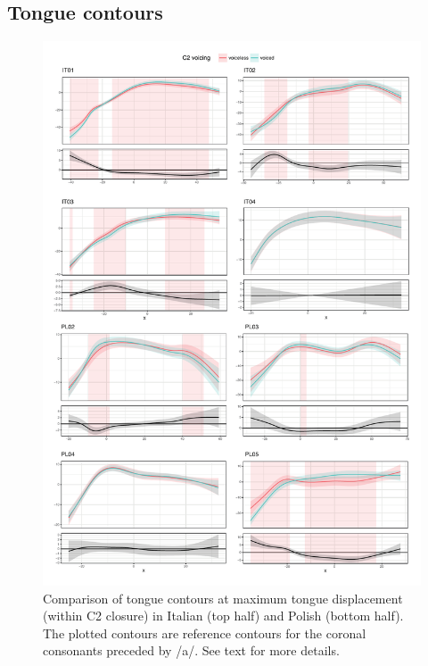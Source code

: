 \documentclass[authoryear, twocolumn]{elsarticle}
\begin{document}
\subsection{Tongue contours}\label{tongue-contours}

\begin{figure}
    \centering
    \includegraphics[height=.9\textheight]{fig/tra.pdf}
    \caption{Comparison of tongue contours at maximum tongue displacement (within C2 closure) in Italian (top half) and Polish (bottom half). The plotted contours are reference contours for the coronal consonants preceded by /a/. See text for more details.}
    \label{f:tra}
\end{figure}
\end{document}
